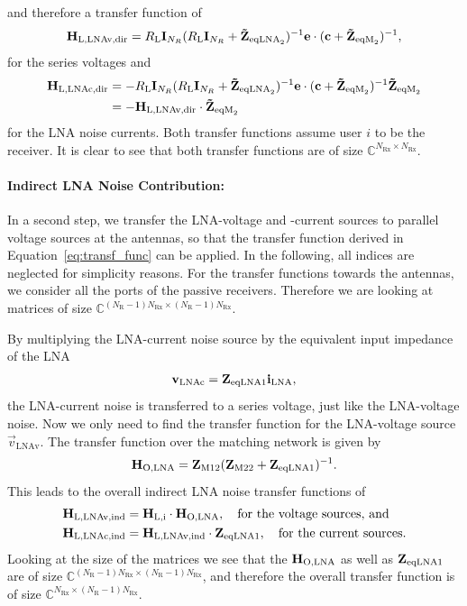 and therefore a transfer function of
\begin{equation}
\label{eq:lnavdir}
\mathbf{H}_\text{L,LNAv,dir} = R_\text{L}\mathbf{I}_{N_R}(R_\text{L}\mathbf{I}_{N_R} + \mathbf{\tilde{Z}}_{\text{eqLNA}_2})^{-1}\mathbf{e}\cdot(\mathbf{c}+\mathbf{\tilde{Z}}_{\text{eqM}_2})^{-1},
\end{equation}
for the series voltages and
\begin{align}\nonumber
\label{eq:lnacdir}
\mathbf{H}_\text{L,LNAc,dir} &= -R_\text{L}\mathbf{I}_{N_R}(R_\text{L}\mathbf{I}_{N_R} + \mathbf{\tilde{Z}}_{\text{eqLNA}_2})^{-1}\mathbf{e}\cdot(\mathbf{c}+\mathbf{\tilde{Z}}_{\text{eqM}_2})^{-1}\mathbf{\tilde{Z}}_{\text{eqM}_2}\\
 &= - \mathbf{H}_\text{L,LNAv,dir}\cdot \mathbf{\tilde{Z}}_{\text{eqM}_2}
\end{align}
for the LNA noise currents.
Both transfer functions assume user $i$ to be the receiver.
It is clear to see that both transfer functions are of size $\mathbb{C}^{N_\text{Rx}\times N_\text{Rx}}$.

\paragraph{Indirect LNA Noise Contribution:}
In a second step, we transfer the LNA-voltage and -current sources to parallel voltage sources at the antennas, so that the transfer function derived in Equation~\eqref{eq:transf_func} can be applied.
In the following, all indices are neglected for simplicity reasons.
For the transfer functions towards the antennas, we consider all the ports of the passive receivers.
Therefore we are looking at matrices of size $\mathbb{C}^{(N_\text{R}-1)N_\text{Rx}\times (N_\text{R}-1)N_\text{Rx}}$.

By multiplying the LNA-current noise source by the equivalent input impedance of the LNA
\begin{align}
\mathbf{v}_\text{LNAc} = \mathbf{Z}_{\text{eqLNA1}} \mathbf{i}_\text{LNA},
\end{align}
the LNA-current noise is transferred to a series voltage, just like the LNA-voltage noise.
Now we only need to find the transfer function for the LNA-voltage source $\vec{v}_\text{LNAv}$.
The transfer function over the matching network is given by
\begin{align}
\label{eq:lnanoise_to_input}
\mathbf{H}_\text{O,LNA} = \mathbf{Z}_\text{M12}(\mathbf{Z}_\text{M22}+\mathbf{Z}_{\text{eqLNA1}})^{-1}.
\end{align}
This leads to the overall indirect LNA noise transfer functions of
\begin{align}
\label{eq:lnaind}\nonumber
\mathbf{H}_\text{L,LNAv,ind} &= \mathbf{H}_\text{L,i}\cdot\mathbf{H}_\text{O,LNA},\quad\text{for the voltage sources, and}\\
\mathbf{H}_\text{L,LNAc,ind} &= \mathbf{H}_\text{L,LNAv,ind}\cdot\mathbf{Z}_{\text{eqLNA1}},\quad\text{for the current sources}.
\end{align}
Looking at the size of the matrices we see that the $\mathbf{H}_\text{O,LNA}$ as well as $\mathbf{Z}_{\text{eqLNA1}}$ are of size $\mathbb{C}^{(N_\text{R}-1)N_\text{Rx}\times (N_\text{R}-1)N_\text{Rx}}$, and therefore the overall transfer function is of size $\mathbb{C}^{N_\text{Rx}\times (N_\text{R}-1)N_\text{Rx}}$.

